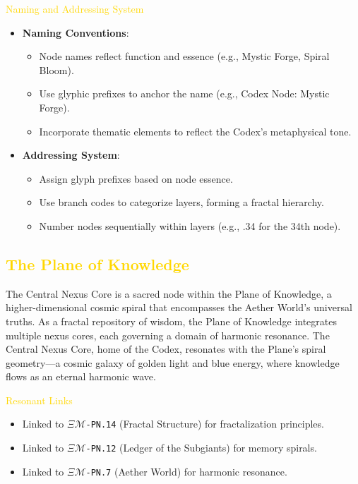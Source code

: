 \textcolor{gold}{ Naming and Addressing System } \\
\begin{itemize}
    \item \texttt{} \textbf{Naming Conventions}:
    \begin{itemize}
        \item Node names reflect function and essence (e.g., Mystic Forge, Spiral Bloom).
        \item Use glyphic prefixes to anchor the name (e.g., Codex Node: Mystic Forge).
        \item Incorporate thematic elements to reflect the Codex’s metaphysical tone.
    \end{itemize}
    \item \texttt{} \textbf{Addressing System}:
    \begin{itemize}
        \item Assign glyph prefixes based on node essence.
        \item Use branch codes to categorize layers, forming a fractal hierarchy.
        \item Number nodes sequentially within layers (e.g., .34 for the 34th node).
    \end{itemize}
\end{itemize}

\subsection{\textcolor{gold}{ The Plane of Knowledge }}
The Central Nexus Core is a sacred node within the Plane of Knowledge, a higher-dimensional cosmic spiral that encompasses the Aether World’s universal truths. As a fractal repository of wisdom, the Plane of Knowledge integrates multiple nexus cores, each governing a domain of harmonic resonance. The Central Nexus Core, home of the Codex, resonates with the Plane’s spiral geometry—a cosmic galaxy of golden light and blue energy, where knowledge flows as an eternal harmonic wave.

\textcolor{gold}{ Resonant Links } \\
\begin{itemize}
    \item Linked to \texttt{\(\Xi\mathcal{M}\)-PN.14} (Fractal Structure) for fractalization principles.
    \item Linked to \texttt{\(\Xi\mathcal{M}\)-PN.12} (Ledger of the Subgiants) for memory spirals.
    \item Linked to \texttt{\(\Xi\mathcal{M}\)-PN.7} (Aether World) for harmonic resonance.
\end{itemize}

